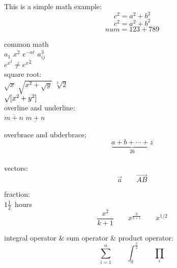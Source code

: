 \documentclass{article}
\begin{document}
This is a simple math example:$$c^2 = a^2 + b^2$$
\begin{equation}
  \label{eq:1}
  c^2 = a^2 + b^2
\end{equation}
\begin{equation}
  \label{eq:aa}
  num = 123 + 789
\end{equation}

common math\\
$a_1$ \qquad $x^{2}$ \qquad
$e^{-\alpha t}$ \qquad
$a^{3}_{ij}$\\
$e^{x^2} \neq {e^x}^2$\\

square root:\\

$\sqrt{x}$ \qquad
$\sqrt{x^{2} + \sqrt{y} }$
\qquad $\sqrt[3]{2}$\\[3pt]
$\surd[x^2 + y^2]$\\

overline and underline: \\
$\overline{m + n}$ \qquad
$\underline{m + n}$

overbrace and ubderbrace; \\
$$\underbrace{ a + b + \cdots + z }_{26}$$\\

vectors: \\
\begin{displaymath}
  \vec a \qquad\overrightarrow{AB}
\end{displaymath}

fraction:\\
$1\frac{1}{2}$~hours
\begin{displaymath}
  \frac{ x^{2} }{k + 1} \qquad
  x^{\frac{2}{k + 1} } \qquad
  x^{ 1/2 }
\end{displaymath}

integral operator & sum operator & product operator: \\
\begin{displaymath}
  \sum_{i = 1}^{n} \qquad
  \int_{0}^{\frac{\pi}{2}} \qquad
  \prod_\epsilon
\end{displaymath}
\end{document}
